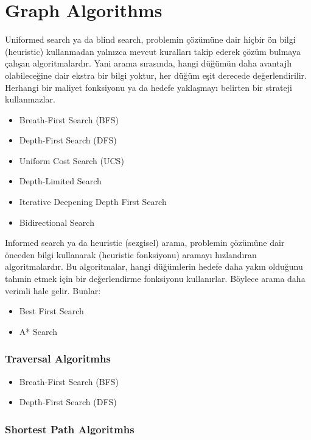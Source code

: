 \section{Graph Algorithms}

Uniformed search ya da blind search, problemin çözümüne dair hiçbir ön bilgi (heuristic) kullanmadan yalnızca mevcut kuralları takip ederek çözüm bulmaya çalışan algoritmalardır. Yani arama sırasında, hangi düğümün daha avantajlı olabileceğine dair ekstra bir bilgi yoktur, her düğüm eşit derecede değerlendirilir. Herhangi bir maliyet fonksiyonu ya da hedefe yaklaşmayı belirten bir strateji kullanmazlar. 

\begin{itemize}
    \item Breath-First Search (BFS)
    \item Depth-First Search (DFS)
    \item Uniform Cost Search (UCS)
    \item Depth-Limited Search
    \item Iterative Deepening Depth First Search
    \item Bidirectional Search
\end{itemize}

Informed search ya da heuristic (sezgisel) arama, problemin çözümüne dair önceden bilgi kullanarak (heuristic fonksiyonu) aramayı hızlandıran algoritmalardır. Bu algoritmalar, hangi düğümlerin hedefe daha yakın olduğunu tahmin etmek için bir değerlendirme fonksiyonu kullanırlar. Böylece arama daha verimli hale gelir. Bunlar:

\begin{itemize}
    \item Best First Search
    \item A* Search
\end{itemize}

\subsubsection{Traversal Algoritmhs}

\begin{itemize}
    \item Breath-First Search (BFS)
    \item Depth-First Search (DFS)
\end{itemize}

\subsubsection{Shortest Path Algoritmhs}

